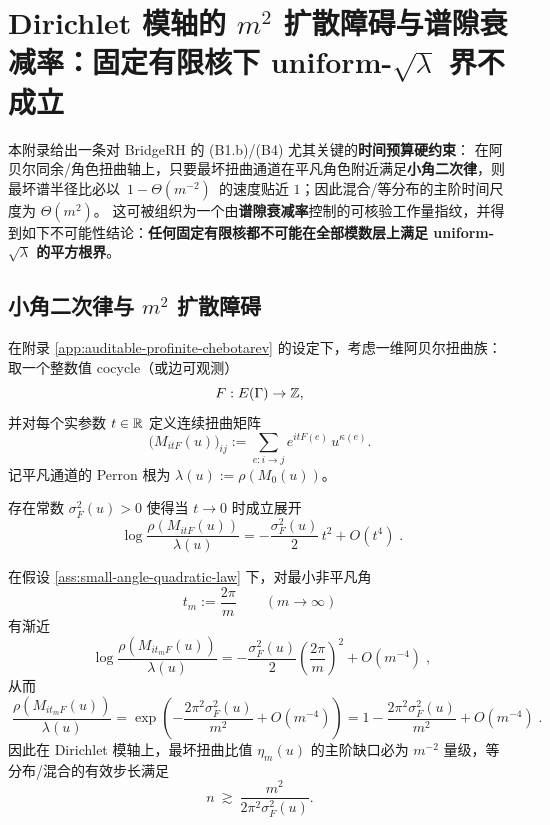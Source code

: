 \section{Dirichlet 模轴的 \texorpdfstring{$m^2$}{m2} 扩散障碍与谱隙衰减率：固定有限核下 uniform-\texorpdfstring{$\sqrt{\lambda}$}{sqrt(lambda)} 界不成立}\label{app:diffusion-barrier-spectral-tax}

本附录给出一条对 BridgeRH 的 (B1.b)/(B4) 尤其关键的\textbf{时间预算硬约束}：
在阿贝尔同余/角色扭曲轴上，只要最坏扭曲通道在平凡角色附近满足\textbf{小角二次律}，则最坏谱半径比必以
\(\,1-\Theta(m^{-2})\,\) 的速度贴近 \(1\)；因此混合/等分布的主阶时间尺度为 \(\Theta(m^2)\)。
这可被组织为一个由\textbf{谱隙衰减率}控制的可核验工作量指纹，并得到如下不可能性结论：\textbf{任何固定有限核都不可能在全部模数层上满足 uniform-\(\sqrt{\lambda}\) 的平方根界}。

\subsection{小角二次律与 \texorpdfstring{$m^2$}{m2} 扩散障碍}\label{subsec:diffusion-barrier}

在附录 \ref{app:auditable-profinite-chebotarev} 的设定下，考虑一维阿贝尔扭曲族：取一个整数值 cocycle（或边可观测）
$$
F:E(\Gamma)\to\mathbb{Z},
$$
并对每个实参数 \(t\in\mathbb{R}\) 定义连续扭曲矩阵
$$
\bigl(M_{itF}(u)\bigr)_{ij}:=\sum_{e:i\to j}e^{itF(e)}\,u^{\kappa(e)}.
$$
记平凡通道的 Perron 根为 \(\lambda(u):=\rho(M_{0}(u))\)。

\begin{assumption}\label{ass:small-angle-quadratic-law}
存在常数 \(\sigma_F^2(u)>0\) 使得当 \(t\to 0\) 时成立展开
$$
\boxed{\;
\log\frac{\rho(M_{itF}(u))}{\lambda(u)}
=-\frac{\sigma_F^2(u)}{2}\,t^2+O(t^4)\; }.
$$
\end{assumption}

\begin{corollary}[Dirichlet 模数的扩散障碍：最小角 \texorpdfstring{$t_m=2\pi/m$}{t_m=2pi/m}]\label{cor:dirichlet-modulus-diffusion-barrier-bridge}
在假设 \ref{ass:small-angle-quadratic-law} 下，对最小非平凡角
$$
t_m:=\frac{2\pi}{m}\qquad(m\to\infty)
$$
有渐近
$$
\boxed{\;
\log\frac{\rho(M_{it_mF}(u))}{\lambda(u)}
=-\frac{\sigma_F^2(u)}{2}\left(\frac{2\pi}{m}\right)^2+O(m^{-4})\; },
$$
从而
$$
\boxed{\;
\frac{\rho(M_{it_mF}(u))}{\lambda(u)}
=\exp\!\left(-\frac{2\pi^2\sigma_F^2(u)}{m^2}+O(m^{-4})\right)
=1-\frac{2\pi^2\sigma_F^2(u)}{m^2}+O(m^{-4})\; }.
$$
因此在 Dirichlet 模轴上，最坏扭曲比值 \(\eta_m(u)\) 的主阶缺口必为 \(m^{-2}\) 量级，等分布/混合的有效步长满足
$$
n\ \gtrsim\ \frac{m^2}{2\pi^2\sigma_F^2(u)}.
$$
\end{corollary}


